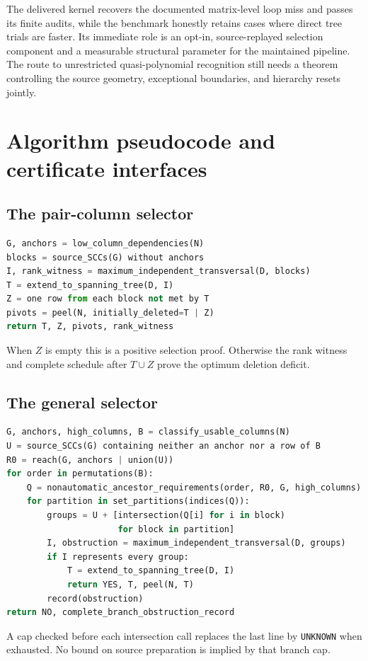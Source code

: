 \documentclass[11pt,letterpaper]{article}
\theoremstyle{definition}
\theoremstyle{remark}
\newcommand{\code}[1]{\nolinkurl{#1}}
\begin{document}
The delivered kernel recovers the documented matrix-level loop miss and passes
its finite audits, while the benchmark honestly retains cases where direct tree
trials are faster. Its immediate role is an opt-in, source-replayed selection
component and a measurable structural parameter for the maintained pipeline.
The route to unrestricted quasi-polynomial recognition still needs a theorem
controlling the source geometry, exceptional boundaries, and hierarchy resets
jointly.

\appendix
\section{Algorithm pseudocode and certificate interfaces}
\subsection{The pair-column selector}
\begin{lstlisting}[language=Python]
G, anchors = low_column_dependencies(N)
blocks = source_SCCs(G) without anchors
I, rank_witness = maximum_independent_transversal(D, blocks)
T = extend_to_spanning_tree(D, I)
Z = one row from each block not met by T
pivots = peel(N, initially_deleted=T | Z)
return T, Z, pivots, rank_witness
\end{lstlisting}
When $Z$ is empty this is a positive selection proof. Otherwise the rank witness
and complete schedule after $T\cup Z$ prove the optimum deletion deficit.

\subsection{The general selector}
\begin{lstlisting}[language=Python]
G, anchors, high_columns, B = classify_usable_columns(N)
U = source_SCCs(G) containing neither an anchor nor a row of B
R0 = reach(G, anchors | union(U))
for order in permutations(B):
    Q = nonautomatic_ancestor_requirements(order, R0, G, high_columns)
    for partition in set_partitions(indices(Q)):
        groups = U + [intersection(Q[i] for i in block)
                      for block in partition]
        I, obstruction = maximum_independent_transversal(D, groups)
        if I represents every group:
            T = extend_to_spanning_tree(D, I)
            return YES, T, peel(N, T)
        record(obstruction)
return NO, complete_branch_obstruction_record
\end{lstlisting}
A cap checked before each intersection call replaces the last line by
\code{UNKNOWN} when exhausted. No bound on source preparation is implied by that
branch cap.
\end{document}

